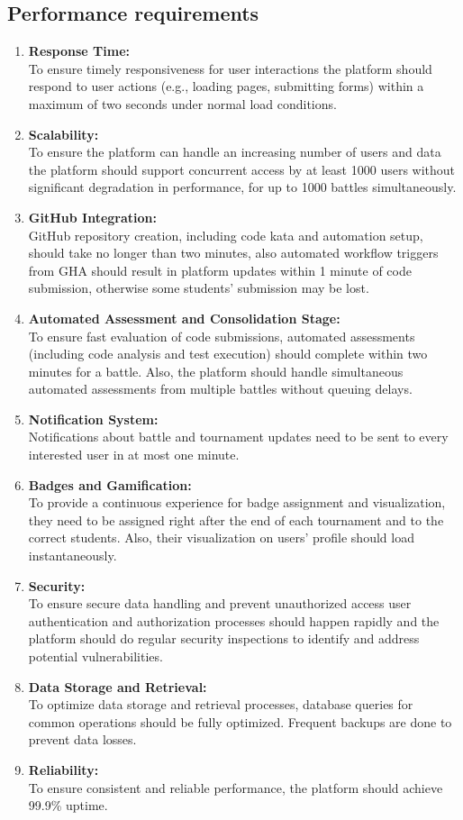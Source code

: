 \subsection{Performance requirements}
\begin{enumerate}
  \item \textbf{Response Time:} \\
  To ensure timely responsiveness for user interactions the platform should respond to user actions (e.g., loading pages, submitting forms) within a maximum of two seconds under normal load conditions.
  \item \textbf{Scalability:} \\
  To ensure the platform can handle an increasing number of users and data the platform should support concurrent access by at least 1000 users without significant degradation in performance, for up to 1000 battles simultaneously.
  \item \textbf{GitHub Integration:} \\
  GitHub repository creation, including code kata and automation setup, should take no longer than two minutes, also automated workflow triggers from GHA should result in platform updates within 1 minute of code submission, otherwise some students’ submission may be lost.
  \item \textbf{Automated Assessment and Consolidation Stage:} \\
  To ensure fast evaluation of code submissions, automated assessments (including code analysis and test execution) should complete within two minutes for a battle. Also, the platform should handle simultaneous automated assessments from multiple battles without queuing delays.
  \item \textbf{Notification System:} \\
  Notifications about battle and tournament updates need to be sent to every interested user in at most one minute.
  \item \textbf{Badges and Gamification:} \\
  To provide a continuous experience for badge assignment and visualization, they need to be assigned right after the end of each tournament and to the correct students. Also, their visualization on users’ profile should load instantaneously.
  \item \textbf{Security:} \\
  To ensure secure data handling and prevent unauthorized access user authentication and authorization processes should happen rapidly and the platform should do regular security inspections to identify and address potential vulnerabilities.
  \item \textbf{Data Storage and Retrieval:} \\
  To optimize data storage and retrieval processes, database queries for common operations should be fully optimized. Frequent backups are done to prevent data losses.
  \item \textbf{Reliability:} \\
  To ensure consistent and reliable performance, the platform should achieve 99.9\% uptime.
\end{enumerate}
